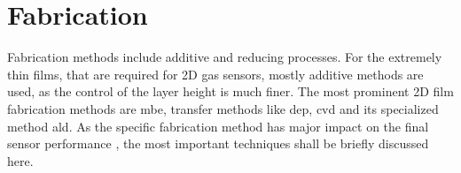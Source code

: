 \section{Fabrication}
\label{sec:fabrication}
Fabrication methods include additive and reducing processes. For the extremely thin films, that are required for 2D gas sensors, mostly additive methods are used, as the control of the layer height is much finer. The most prominent 2D film fabrication methods are \gls{mbe}, transfer methods like \gls{dep}, \gls{cvd} and its specialized method \gls{ald}. As the specific fabrication method has major impact on the final sensor performance \cite{Deng2019}, the most important techniques shall be briefly discussed here.
